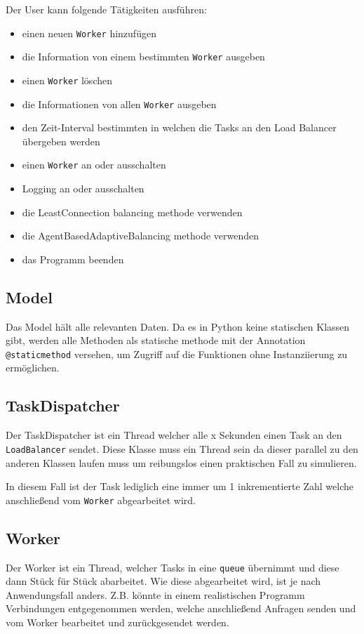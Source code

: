 Der User kann folgende Tätigkeiten ausführen:

\begin{itemize}
	\item einen neuen \verb|Worker| hinzufügen
	\item die Information von einem bestimmten \verb|Worker| ausgeben
	\item einen \verb|Worker| löschen
	\item die Informationen von allen \verb|Worker| ausgeben
	\item den Zeit-Interval bestimmten in welchen die Tasks an den Load Balancer übergeben werden
	\item einen \verb|Worker| an oder ausschalten
	\item Logging an oder ausschalten
	\item die LeastConnection balancing methode verwenden
	\item die AgentBasedAdaptiveBalancing methode verwenden
	\item das Programm beenden
\end{itemize}

\subsection{Model}
Das Model hält alle relevanten Daten. Da es in Python keine statischen Klassen gibt, werden alle Methoden als statische methode mit der Annotation \verb|@staticmethod| versehen, um Zugriff auf die Funktionen ohne Instanziierung zu ermöglichen.

\subsection{TaskDispatcher}
Der TaskDispatcher ist ein Thread welcher alle x Sekunden einen Task an den \verb|LoadBalancer| sendet. Diese Klasse muss ein Thread sein da dieser parallel zu den anderen Klassen laufen muss um reibungslos einen praktischen Fall zu simulieren. 

In diesem Fall ist der Task lediglich eine immer um 1 inkrementierte Zahl welche anschließend vom \verb|Worker| abgearbeitet wird. 

\subsection{Worker}
Der Worker ist ein Thread, welcher Tasks in eine \verb|queue| übernimmt und diese dann Stück für Stück abarbeitet. Wie diese abgearbeitet wird, ist je nach Anwendungsfall anders. Z.B. könnte in einem realistischen Programm Verbindungen entgegenommen werden, welche anschließend Anfragen senden und vom Worker bearbeitet und zurückgesendet werden. 

